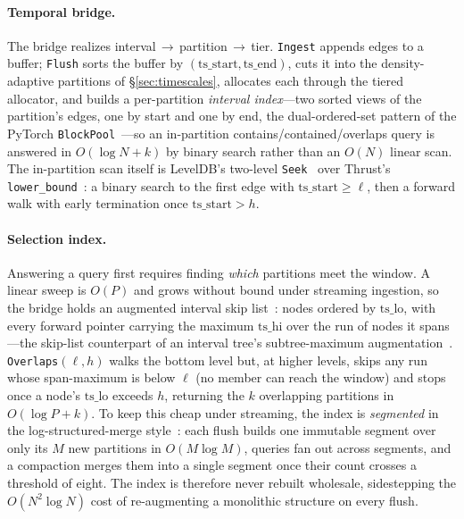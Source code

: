 \documentclass[10pt]{article}
\theoremstyle{definition}
\begin{document}
\paragraph{Temporal bridge.}
The bridge realizes interval\,$\rightarrow$\,partition\,$\rightarrow$\,tier.
\texttt{Ingest} appends edges to a buffer; \texttt{Flush} sorts the buffer by
$(\mathrm{ts\_start},\mathrm{ts\_end})$, cuts it into the density-adaptive
partitions of \S\ref{sec:timescales}, allocates each through the tiered
allocator, and builds a per-partition \emph{interval index}---two sorted views of
the partition's edges, one by start and one by end, the dual-ordered-set pattern
of the PyTorch \texttt{BlockPool}~\citep{paszke2019pytorch}---so an in-partition
contains/contained/overlaps query is answered in $O(\log N + k)$ by binary
search rather than an $O(N)$ linear scan. The in-partition scan itself is
LevelDB's two-level \texttt{Seek}~\citep{leveldb} over Thrust's
\texttt{lower\_bound}~\citep{cccl}: a binary search to the first edge with
$\mathrm{ts\_start}\ge\ell$, then a forward walk with early termination once
$\mathrm{ts\_start}>h$.

\paragraph{Selection index.}
Answering a query first requires finding \emph{which} partitions meet the window.
A linear sweep is $O(P)$ and grows without bound under streaming ingestion, so the
bridge holds an augmented interval skip list~\citep{pugh1990skiplists}: nodes
ordered by $\mathrm{ts\_lo}$, with every forward pointer carrying the maximum
$\mathrm{ts\_hi}$ over the run of nodes it spans---the skip-list counterpart of an
interval tree's subtree-maximum augmentation~\citep[\S14.3]{clrs2009}.
\texttt{Overlaps}$(\ell,h)$ walks the bottom level but, at higher levels, skips
any run whose span-maximum is below $\ell$ (no member can reach the window) and
stops once a node's $\mathrm{ts\_lo}$ exceeds $h$, returning the $k$ overlapping
partitions in $O(\log P + k)$. To keep this cheap under streaming, the index is
\emph{segmented} in the log-structured-merge style~\citep{oneil1996lsm}: each
flush builds one immutable segment over only its $M$ new partitions in
$O(M\log M)$, queries fan out across segments, and a compaction merges them into a
single segment once their count crosses a threshold of eight. The index is
therefore never rebuilt wholesale, sidestepping the $O(N^2\log N)$ cost of
re-augmenting a monolithic structure on every flush.
\end{document}
